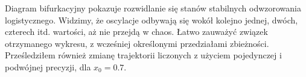 \documentclass{article}
\begin{document}
        Diagram bifurkacyjny pokazuje rozwidlanie się stanów stabilnych odwzorowania logistycznego. Widzimy, że oscylacje odbywają się wokół kolejno jednej, dwóch, czterech itd. wartości, aż nie przejdą w chaos. Łatwo zauważyć związek otrzymanego wykresu, z wcześniej określonymi przedziałami zbieżności. 
        \FloatBarrier
        Prześledziłem również zmianę trajektorii liczonych z użyciem pojedynczej i podwójnej precyzji, dla $x_0=0.7$. 
        \begin{figure}[h!]
            \centering
            \\

\end{figure}
\end{document}
